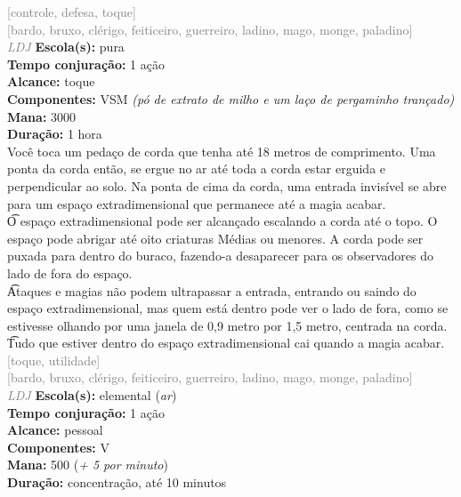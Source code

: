 \documentclass{RPG_Adventure}[2021/10/20]
\begin{document}
{\scriptsize \textcolor{gray}{[controle, defesa, toque]\\}}
{\scriptsize \textcolor{gray}{[bardo, bruxo, clérigo, feiticeiro, guerreiro, ladino, mago, monge, paladino]\\}}
{\tiny \textcolor{gray}{\textit{LDJ}}}
{\small \t \textbf{Escola(s):} pura\\\t \textbf{Tempo conjuração:} 1 ação\\\t \textbf{Alcance:} toque\\\t \textbf{Componentes:} VSM \textit{(pó de extrato de milho e um laço de pergaminho trançado)}\\\t \textbf{Mana:} 3000\\\t \textbf{Duração:} 1 hora\\}
{\normalsize Você toca um pedaço de corda que tenha até 18 metros de comprimento. Uma ponta da corda então, se ergue no ar até toda a corda estar erguida e perpendicular ao solo. Na ponta de cima da corda, uma entrada invisível se abre para um espaço extradimensional que permanece até a magia acabar.\\\t O espaço extradimensional pode ser alcançado escalando a corda até o topo. O espaço pode abrigar até oito criaturas Médias ou menores. A corda pode ser puxada para dentro do buraco, fazendo-a desaparecer para os observadores do lado de fora do espaço.\\\t Ataques e magias não podem ultrapassar a entrada, entrando ou saindo do espaço extradimensional, mas quem está dentro pode ver o lado de fora, como se estivesse olhando por uma janela de 0,9 metro por 1,5 metro, centrada na corda.\\\t Tudo que estiver dentro do espaço extradimensional cai quando a magia acabar.\\}
{\scriptsize \textcolor{gray}{[toque, utilidade]\\}}
{\scriptsize \textcolor{gray}{[bardo, bruxo, clérigo, feiticeiro, guerreiro, ladino, mago, monge, paladino]\\}}
{\tiny \textcolor{gray}{\textit{LDJ}}}
{\small \t \textbf{Escola(s):} elemental (\textit{ar})\\\t \textbf{Tempo conjuração:} 1 ação\\\t \textbf{Alcance:} pessoal\\\t \textbf{Componentes:} V\\\t \textbf{Mana:} 500 (\textit{+ 5 por minuto})\\\t \textbf{Duração:} concentração, até 10 minutos\\}
\end{document}

